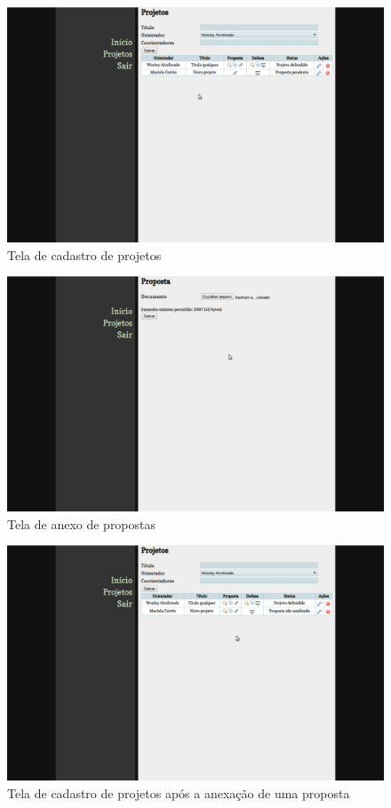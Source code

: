 \begin{figure}[htbp]
\centering
\includegraphics[width=1\textwidth]{fig/telas/processo/aluno_02_projeto_cadastrado.png}
\caption{Tela de cadastro de projetos}
\label{fig:aluno_02_projeto_cadastrado}
\end{figure}

\begin{figure}[htbp]
\centering
\includegraphics[width=1\textwidth]{fig/telas/processo/aluno_03_anexo_proposta.png}
\caption{Tela de anexo de propostas}
\label{fig:aluno_03_anexo_proposta}
\end{figure}

\begin{figure}[htbp]
\centering
\includegraphics[width=1\textwidth]{fig/telas/processo/aluno_04_proposta_anexada.png}
\caption{Tela de cadastro de projetos após a anexação de uma proposta}
\label{fig:aluno_04_proposta_anexada}
\end{figure}

